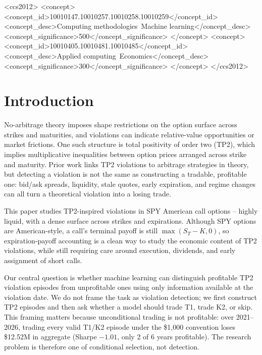 \documentclass[sigconf,review]{acmart}
\begin{document}
\begin{CCSXML}
<ccs2012>
 <concept>
  <concept_id>10010147.10010257.10010258.10010259</concept_id>
  <concept_desc>Computing methodologies~Machine learning</concept_desc>
  <concept_significance>500</concept_significance>
 </concept>
 <concept>
  <concept_id>10010405.10010481.10010485</concept_id>
  <concept_desc>Applied computing~Economics</concept_desc>
  <concept_significance>300</concept_significance>
 </concept>
</ccs2012>
\end{CCSXML}



\maketitle

\section{Introduction}
\label{sec:intro}

No-arbitrage theory imposes shape restrictions on the option surface across strikes and maturities, and violations can indicate relative-value opportunities or market frictions. One such structure is total positivity of order two (TP2), which implies multiplicative inequalities between option prices arranged across strike and maturity. Prior work links TP2 violations to arbitrage strategies in theory, but detecting a violation is not the same as constructing a tradable, profitable one: bid/ask spreads, liquidity, stale quotes, early expiration, and regime changes can all turn a theoretical violation into a losing trade.

This paper studies TP2-inspired violations in SPY American call options -- highly liquid, with a dense surface across strikes and expirations. Although SPY options are American-style, a call's terminal payoff is still $\max(S_T-K,0)$, so expiration-payoff accounting is a clean way to study the economic content of TP2 violations, while still requiring care around execution, dividends, and early assignment of short calls.

Our central question is whether machine learning can distinguish profitable TP2 violation episodes from unprofitable ones using only information available at the violation date. We do not frame the task as violation detection; we first construct TP2 episodes and then ask whether a model should trade T1, trade K2, or skip. This framing matters because unconditional trading is not profitable: over 2021--2026, trading every valid T1/K2 episode under the \$1,000 convention loses \$12.52M in aggregate (Sharpe $-1.01$, only 2 of 6 years profitable). The research problem is therefore one of conditional selection, not detection.
\end{document}
